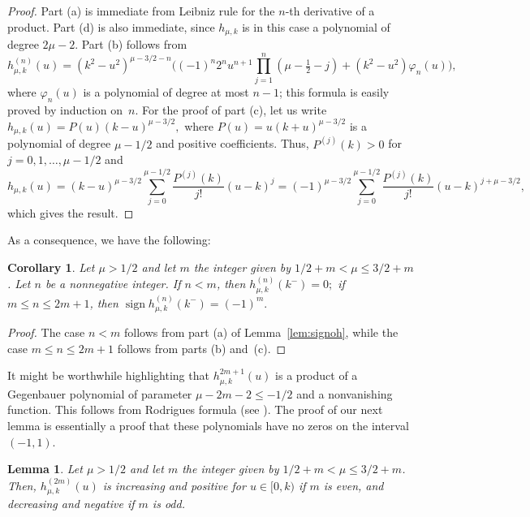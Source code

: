 \documentclass[10pt,a4paper]{article}
\numberwithin{equation}{section}
\theoremstyle{plain}
\newtheorem{Cor}[Theo]{Corollary}
\newtheorem{Lem}[Theo]{Lemma}
\theoremstyle{definition}
\newcommand{\sign}{\operatorname{sign}}
\begin{document}
\begin{proof}
Part (a) is immediate from Leibniz rule for the $n$-th derivative of a product. Part (d) is also immediate, since $h_{\mu,k}$ is in this case a polynomial of degree $2\mu - 2$. Part (b) follows from
\[
   h_{\mu,k}^{(n)}(u) = (k^2 - u^2)^{\mu - 3/2 - n}
   \bigg(
   (-1)^n 2^n u^{n+1} \prod_{j=1}^n (\mu - \tfrac{1}{2} - j)
   + (k^2 - u^2) \varphi_n(u)
   \bigg),
\]
where $\varphi_n(u)$ is a polynomial of degree at most $n-1$; this formula is easily proved by induction on~$n$. For the proof of part (c), let us write
$
   h_{\mu,k}(u) = P(u) (k-u)^{\mu - 3/2},
$
where $P(u) = u (k+u)^{\mu - 3/2}$ is a polynomial of degree $\mu - 1/2$ and positive coefficients. Thus, $P^{(j)}(k) > 0$ for $j=0,1,\dots,\mu-1/2$ and
\[
   h_{\mu,k}(u) = (k-u)^{\mu - 3/2}
   \sum_{j=0}^{\mu - 1/2} \frac{P^{(j)}(k)}{j!} (u-k)^j
   = (-1)^{\mu - 3/2}
   \sum_{j=0}^{\mu - 1/2} \frac{P^{(j)}(k)}{j!} (u-k)^{j+\mu-3/2},
\]
which gives the result.
\end{proof}

As a consequence, we have the following:

\begin{Cor}
\label{cor:signoh}
Let $\mu > 1/2$ and let $m$ the integer given by $1/2 + m < \mu \leq 3/2 + m$. Let $n$ be a nonnegative integer. If $n < m$, then
$
   h_{\mu,k}^{(n)}(k^-) = 0;
$
if $m \leq n \leq 2m+1$, then
$
   \sign h_{\mu,k}^{(n)}(k^-) = (-1)^m.
$
\end{Cor}

\begin{proof}
The case $n < m$ follows from part (a) of Lemma~\ref{lem:signoh}, while the case $m \leq n \leq 2m+1$ follows from parts (b) and~(c).
\end{proof}

It might be worthwhile highlighting that $h_{\mu,k}^{2m+1}(u)$ is a product of a Gegenbauer polynomial of parameter $\mu-2m-2 \leq -1/2$ and a nonvanishing function. This follows from Rodrigues formula (see \cite[(4.3.1), p.~67]{Sz}). The proof of our next lemma is essentially a proof that these polynomials have no zeros on the interval $(-1,1)$.

\begin{Lem}
\label{lem:claim1}
Let $\mu > 1/2$ and let $m$ the integer given by $1/2 + m < \mu \leq 3/2 + m$. Then, $h_{\mu,k}^{(2m)}(u)$ is increasing and positive for $u \in [0,k)$ if $m$ is even, and decreasing and negative if $m$ is odd.
\end{Lem}
\end{document}
